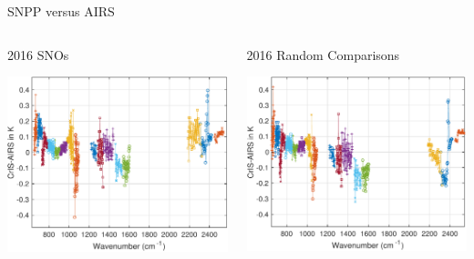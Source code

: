 \documentclass[10pt,t]{beamer}
\begin{document}
\begin{frame}[label={sec:orgeae713d}]{SNPP versus AIRS}
\vspace{-0.3in}

\begin{columns}
\begin{column}{0.55\columnwidth}
\begin{block}{\footnotesize 2016 SNOs}
\vspace{-0.1in}
\begin{center}
\includegraphics[width=\linewidth]{./Figs/Pdf/snpp_vs_airs_sno.pdf}
\end{center}
\end{block}
\end{column}

\begin{column}{0.55\columnwidth}
\begin{block}{\footnotesize 2016 Random Comparisons}
\vspace{-0.1in}
\begin{center}
\includegraphics[width=\linewidth]{./Figs/Pdf/snpp_vs_airs_stats.pdf}
\end{center}
\end{block}
\end{column}
\end{columns}


\end{frame}
\end{document}
